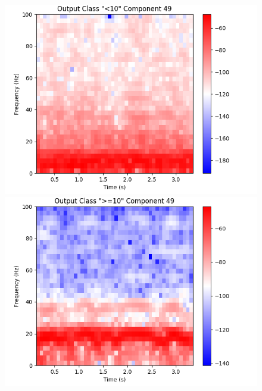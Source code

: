 \documentclass[fleqn,10pt]{wlscirep}
\begin{document}
\begin{figure}[t!]
\begin{minipage}{0.24\textwidth}
    \includegraphics[width=\linewidth]{max_act/artificial_spec_49_0.png}
    \subcaption{}
  \end{minipage}
  \hspace*{\fill} 
  \begin{minipage}{0.24\textwidth}
    \includegraphics[width=\linewidth]{max_act/artificial_spec_49_1.png}
    \subcaption{}
  \end{minipage}
  \begin{minipage}{0.24\textwidth}

\end{minipage}
\end{figure}
\end{document}
